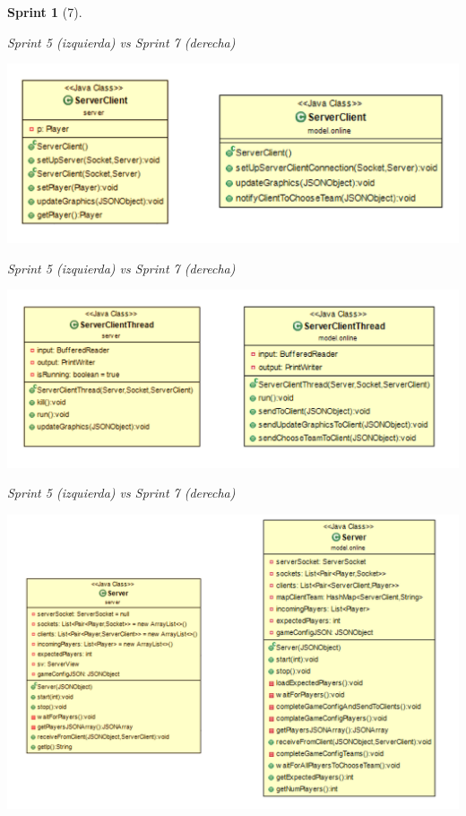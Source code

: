 \documentclass[12pt,a4paper,openright]{book}
\theoremstyle{break}
\newtheorem*{sprint}{Sprint}
\begin{document}
\begin{sprint}[7]
\begin{center}
Sprint 5 (izquierda) vs Sprint 7 (derecha)
\end{center}

\begin{center}
\includegraphics[scale=0.3]{ServerClient-evol.png} 

Sprint 5 (izquierda) vs Sprint 7 (derecha)
\end{center}

\begin{center}
\includegraphics[scale=0.3]{ServerClientThread-evol.png} 

Sprint 5 (izquierda) vs Sprint 7 (derecha)
\end{center}

\begin{center}
\includegraphics[scale=0.3]{server-evol.png} 


\end{center}
\end{sprint}
\end{document}
